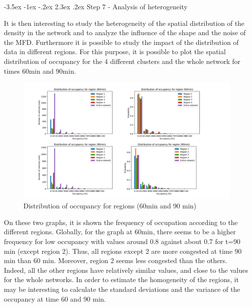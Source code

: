 \documentclass[a4paper, 12pt,oneside]{article}
\makeatletter
\renewcommand{\section}{\@startsection {section}{1}{\z@}%
             {-3.5ex \@plus -1ex \@minus -.2ex}%
             {2.3ex \@plus.2ex}%
             {\normalfont\normalsize\bfseries}}
\makeatother
\begin{document}
\section{Step 7 - Analysis of heterogeneity}

It is then interesting to study the heterogeneity of the spatial distribution of the density in the network and to analyze the influence of the shape and the noise of the MFD. Furthermore it is possible to study the impact of the distribution of data in different regions. For this purpose, it is possible to plot the spatial distribution of occupancy for the 4 different clusters and the
whole network for times 60min and 90min.
\begin{figure}[H]
    \begin{center}
        \includegraphics[width=19cm]{Images/Distribution of occupancy for region 4 graphs.png}
        \caption{Distribution of occupancy for regions (60min and 90 min)}
        \label{Distribution of occupancy for region (60min and 90 min)}
    \end{center}
\end{figure}



On these two graphs, it is shown the frequency of occupation according to the different regions. Globally, for the graph at 60min, there seems to be a higher frequency for low occupancy with values around 0.8 against about 0.7 for t=90 min (except region 2). Thus, all regions except 2 are more congested at time 90 min than 60 min. Moreover, region 2 seems less congested than the others. Indeed, all the other regions have relatively similar values, and close to the values for the whole networks.
\bigbreak
In order to estimate the homogeneity of the regions, it may be interesting to calculate the standard deviations and the variance of the occupancy at time 60 and 90 min.
\end{document}
